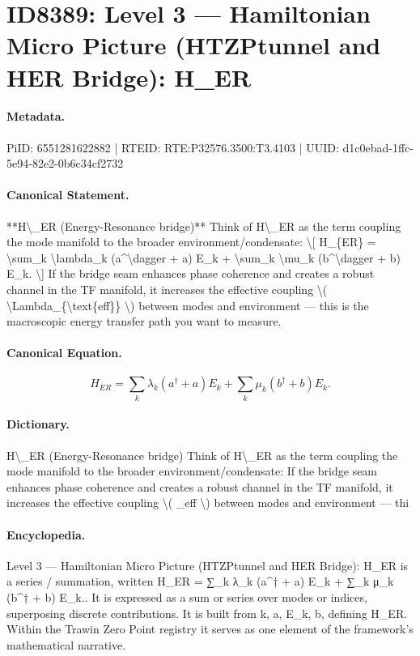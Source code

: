 \section*{ID8389: Level 3 — Hamiltonian Micro Picture (HTZPtunnel and HER Bridge): H\_ER}
\paragraph{Metadata.}
PiID: 6551281622882 | RTEID: RTE:P32576.3500:T3.4103 | UUID: d1c0ebad-1ffc-5e94-82e2-0b6c34cf2732

\paragraph{Canonical Statement.}
**H\textbackslash{}\_ER (Energy-Resonance bridge)** Think of H\textbackslash{}\_ER as the term coupling the mode manifold to the broader environment/condensate: \textbackslash{}[ H\_\{ER\} = \textbackslash{}sum\_k \textbackslash{}lambda\_k (a\textasciicircum{}\textbackslash{}dagger + a) E\_k + \textbackslash{}sum\_k \textbackslash{}mu\_k (b\textasciicircum{}\textbackslash{}dagger + b) E\_k. \textbackslash{}] If the bridge seam enhances phase coherence and creates a robust channel in the TF manifold, it increases the effective coupling \textbackslash{}( \textbackslash{}Lambda\_\{\textbackslash{}text\{eff\}\} \textbackslash{}) between modes and environment — this is the macroscopic energy transfer path you want to measure.

\paragraph{Canonical Equation.}
\[
H_{ER} = \sum_k \lambda_k (a^\dagger + a) E_k + \sum_k \mu_k (b^\dagger + b) E_k.
\]

\paragraph{Dictionary.}
H\textbackslash{}\_ER (Energy-Resonance bridge) Think of H\textbackslash{}\_ER as the term coupling the mode manifold to the broader environment/condensate: If the bridge seam enhances phase coherence and creates a robust channel in the TF manifold, it increases the effective coupling \textbackslash{}( \_eff \textbackslash{}) between modes and environment — thi

\paragraph{Encyclopedia.}
Level 3 — Hamiltonian Micro Picture (HTZPtunnel and HER Bridge): H\_ER is a series / summation, written H\_ER = ∑\_k λ\_k (a\textasciicircum{}† + a) E\_k + ∑\_k μ\_k (b\textasciicircum{}† + b) E\_k.. It is expressed as a sum or series over modes or indices, superposing discrete contributions. It is built from k, a, E\_k, b, defining H\_ER. Within the Trawin Zero Point registry it serves as one element of the framework's mathematical narrative.
